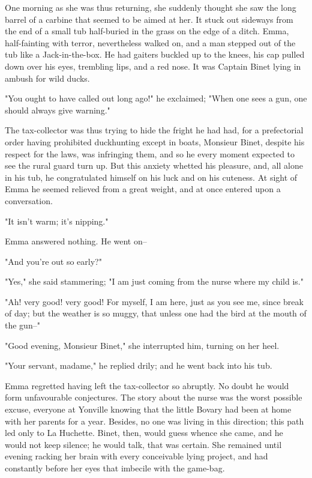 \documentclass{tufte-book}
\begin{document}
One morning as she was thus returning, she suddenly thought she saw the
long barrel of a carbine that seemed to be aimed at her. It stuck out
sideways from the end of a small tub half-buried in the grass on the
edge of a ditch. Emma, half-fainting with terror, nevertheless walked
on, and a man stepped out of the tub like a Jack-in-the-box. He had
gaiters buckled up to the knees, his cap pulled down over his eyes,
trembling lips, and a red nose. It was Captain Binet lying in ambush for
wild ducks.

"You ought to have called out long ago!" he exclaimed; "When one sees a
gun, one should always give warning."

The tax-collector was thus trying to hide the fright he had had, for
a prefectorial order having prohibited duckhunting except in boats,
Monsieur Binet, despite his respect for the laws, was infringing them,
and so he every moment expected to see the rural guard turn up. But
this anxiety whetted his pleasure, and, all alone in his tub, he
congratulated himself on his luck and on his cuteness. At sight of
Emma he seemed relieved from a great weight, and at once entered upon a
conversation.

"It isn't warm; it's nipping."

Emma answered nothing. He went on--

"And you're out so early?"

"Yes," she said stammering; "I am just coming from the nurse where my
child is."

"Ah! very good! very good! For myself, I am here, just as you see me,
since break of day; but the weather is so muggy, that unless one had the
bird at the mouth of the gun--"

"Good evening, Monsieur Binet," she interrupted him, turning on her
heel.

"Your servant, madame," he replied drily; and he went back into his tub.

Emma regretted having left the tax-collector so abruptly. No doubt he
would form unfavourable conjectures. The story about the nurse was the
worst possible excuse, everyone at Yonville knowing that the little
Bovary had been at home with her parents for a year. Besides, no one
was living in this direction; this path led only to La Huchette. Binet,
then, would guess whence she came, and he would not keep silence; he
would talk, that was certain. She remained until evening racking her
brain with every conceivable lying project, and had constantly before
her eyes that imbecile with the game-bag.
\end{document}
